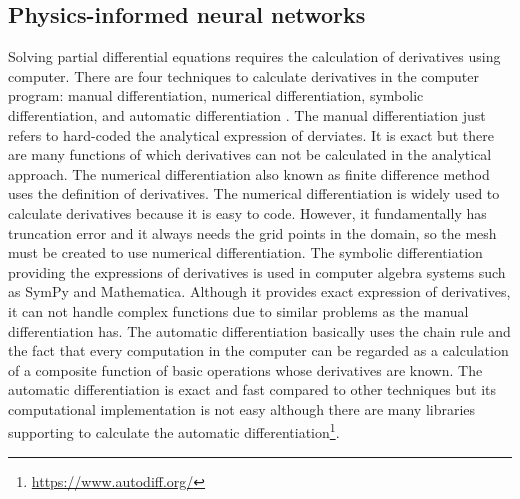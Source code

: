 


\subsection{Physics-informed neural networks}
Solving partial differential equations requires the calculation of derivatives using computer. There are four techniques to calculate derivatives in the computer program: manual differentiation, numerical differentiation, symbolic differentiation, and automatic differentiation \parencite{baydin2018automatic, margossian2019review}. The manual differentiation just refers to hard-coded the analytical expression of derviates. It is exact but there are many functions of which derivatives can not be calculated in the analytical approach. The numerical differentiation also known as finite difference method uses the definition of derivatives. The numerical differentiation is widely used to calculate derivatives because it is easy to code. However, it fundamentally has truncation error and it always needs the grid points in the domain, so the mesh must be created to use numerical differentiation. The symbolic differentiation providing the expressions of derivatives is used in computer algebra systems such as SymPy and Mathematica. Although it provides exact expression of derivatives, it can not handle complex functions due to similar problems as the manual differentiation has. The automatic differentiation basically uses the chain rule and the fact that every computation in the computer can be regarded as a calculation of a composite function of basic operations whose derivatives are known. The automatic differentiation is exact and fast compared to other techniques but its computational implementation is not easy although there are many libraries supporting to calculate the automatic differentiation\footnote{\url{https://www.autodiff.org/}}.

